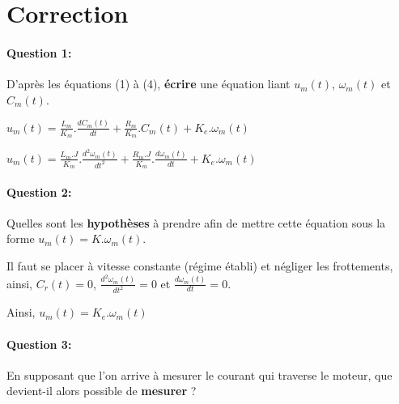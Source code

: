 \pagestyle{correction}

\section{Correction}

\paragraph{Question 1:} D'après les équations (1) à (4), \textbf{écrire} une équation liant $u_m(t)$, $\omega_m(t)$ et $C_m(t)$.

$u_m(t)=\frac{L_m}{K_m}.\frac{dC_m(t)}{dt}+\frac{R_m}{K_m}.C_m(t)+K_e.\omega_m(t)$

$u_m(t)=\frac{L_m.J}{K_m}.\frac{d^2\omega_m(t)}{dt^2}+\frac{R_m.J}{K_m}.\frac{d\omega_m(t)}{dt}+K_e.\omega_m(t)$


\paragraph{Question 2:} Quelles sont les \textbf{hypothèses} à prendre afin de mettre cette équation sous la forme $u_m(t)=K.\omega_m(t)$.

Il faut se placer à vitesse constante (régime établi) et négliger les frottements, ainsi, $C_r(t)=0$, $\frac{d^2\omega_m(t)}{dt^2}=0$ et $\frac{d\omega_m(t)}{dt}=0$.

Ainsi, $u_m(t)=K_e.\omega_m(t)$



\paragraph{Question 3:} En supposant que l'on arrive à mesurer le courant qui traverse le moteur, que devient-il alors possible de \textbf{mesurer} ?

